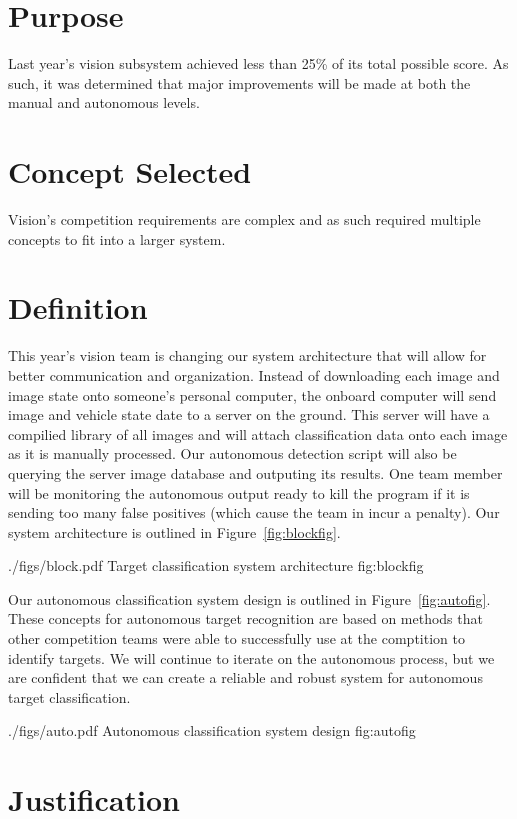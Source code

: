 \documentclass[]{auvsi_doc}
\begin{document}
\begin{AUVSITitlePage}
\begin{artifacttable}
\end{artifacttable}
\end{AUVSITitlePage}

\section{Purpose}

Last year's vision subsystem achieved less than 25\% of its total possible score. As such, it was determined that major improvements will be made at both the manual and autonomous levels.

\section{Concept Selected}

Vision's competition requirements are complex and as such required multiple concepts to fit into a larger system. 

\section{Definition}

This year's vision team is changing our system architecture that will allow for better
communication and organization. Instead of downloading each image and image state
onto someone's personal computer, the onboard computer will send image and vehicle state
date to a server on the ground. This server will have a compilied library of all images
and will attach classification data onto each image as it is manually processed. Our 
autonomous detection script will also be querying the server image database and outputing
its results. One team member will be monitoring the autonomous output ready to kill the 
program if it is sending too many false positives (which cause the team in incur a 
penalty). Our system architecture is outlined in Figure~\ref{fig:blockfig}.

\AUVSIFigure
{./figs/block.pdf}
{\textwidth}
{Target classification system architecture}
{fig:blockfig}

Our autonomous classification system design is outlined in Figure~\ref{fig:autofig}.
These concepts for autonomous target recognition are based on methods that
other competition teams were able to successfully use at the comptition to
identify targets. We will continue to iterate on the autonomous process, but
we are confident that we can create a reliable and robust system for autonomous
target classification.

\AUVSIFigure
{./figs/auto.pdf}
{\textwidth}
{Autonomous classification system design}
{fig:autofig}

\section{Justification}

\end{document}
